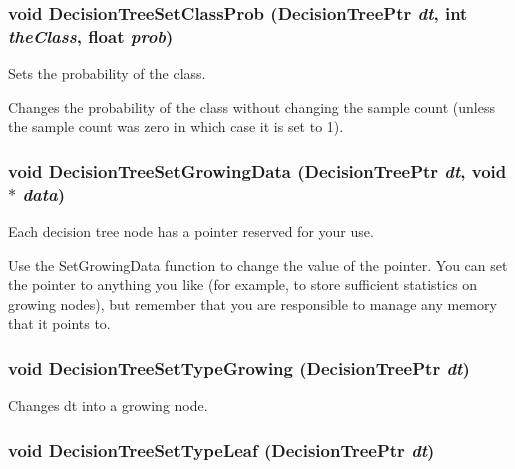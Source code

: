 \subsubsection{\setlength{\rightskip}{0pt plus 5cm}void Decision\-Tree\-Set\-Class\-Prob ({\bf Decision\-Tree\-Ptr} {\em dt}, int {\em the\-Class}, float {\em prob})}\label{DecisionTree_8h_a16}


Sets the probability of the class. 

Changes the probability of the class without changing the sample count (unless the sample count was zero in which case it is set to 1). 
\subsubsection{\setlength{\rightskip}{0pt plus 5cm}void Decision\-Tree\-Set\-Growing\-Data ({\bf Decision\-Tree\-Ptr} {\em dt}, void $\ast$ {\em data})}\label{DecisionTree_8h_a31}


Each decision tree node has a pointer reserved for your use. 

Use the Set\-Growing\-Data function to change the value of the pointer. You can set the pointer to anything you like (for example, to store sufficient statistics on growing nodes), but remember that you are responsible to manage any memory that it points to. 
\subsubsection{\setlength{\rightskip}{0pt plus 5cm}void Decision\-Tree\-Set\-Type\-Growing ({\bf Decision\-Tree\-Ptr} {\em dt})}\label{DecisionTree_8h_a20}


Changes dt into a growing node. 

\subsubsection{\setlength{\rightskip}{0pt plus 5cm}void Decision\-Tree\-Set\-Type\-Leaf ({\bf Decision\-Tree\-Ptr} {\em dt})}\label{DecisionTree_8h_a19}


